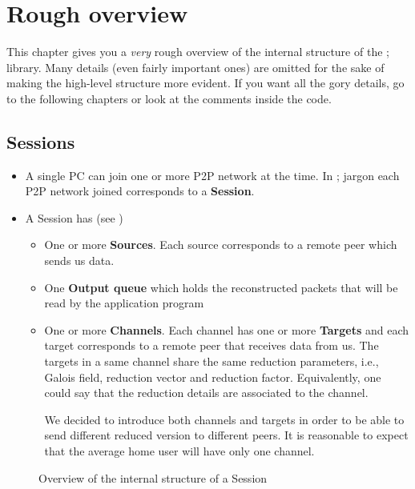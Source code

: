 \documentclass[a4paper]{medusabook}
\begin{document}
\chapter{Rough overview}
\label{chap:0;overview}

This chapter gives you a \emph{very} rough overview of the internal
structure of the \ppmtp; library.  Many details (even fairly important
ones) are omitted for the sake of making the high-level structure more
evident.  If you want all the gory details, go to the following
chapters or look at the comments inside the code.

\section{Sessions}
\label{sect:0.1;overview}


\begin{itemize}
\item
A single PC can join one or more P2P network at the time.  In \ppmtp;
jargon each P2P network joined corresponds to a \textbf{Session}.
\item
A Session has (see )
\begin{itemize}
  \item
    One or more \textbf{Sources}.  Each source corresponds to a remote
    peer which sends us data.
  \item
    One \textbf{Output queue} which holds the reconstructed packets
    that will be read by the application program
  \item
    One or more \textbf{Channels}.  Each channel has one or more
    \textbf{Targets} and each target corresponds to a remote peer that
    receives data from us.  The targets in a same channel share the
    same reduction parameters, i.e., Galois field, reduction vector
    and reduction factor. Equivalently, one could say that the
    reduction details are associated to the channel.

    We decided to introduce both channels and targets in order to be
    able to send different reduced version to different peers.  It is
    reasonable to expect that the average home user will have only one
    channel. 
\end{itemize}
\end{itemize}

%
\begin{figure}
\centerline{}
\caption{Overview of the internal structure of a Session 
\label{fig:session}}
\end{figure}
%
\end{document}

